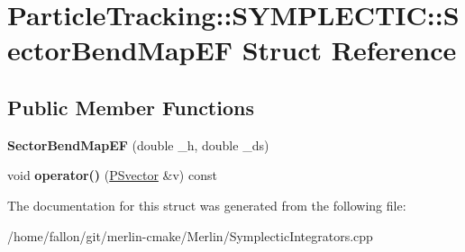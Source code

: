 \hypertarget{structParticleTracking_1_1SYMPLECTIC_1_1SectorBendMapEF}{}\section{Particle\+Tracking\+:\+:S\+Y\+M\+P\+L\+E\+C\+T\+IC\+:\+:Sector\+Bend\+Map\+EF Struct Reference}
\label{structParticleTracking_1_1SYMPLECTIC_1_1SectorBendMapEF}
\subsection*{Public Member Functions}
\begin{DoxyCompactItemize}
\item 
\mbox{\label{structParticleTracking_1_1SYMPLECTIC_1_1SectorBendMapEF_af3fdf64108479cdfd8092724014399a9}} 
{\bfseries Sector\+Bend\+Map\+EF} (double \+\_\+h, double \+\_\+ds)
\item 
\mbox{\label{structParticleTracking_1_1SYMPLECTIC_1_1SectorBendMapEF_abd7fcf774577927f6e758299a7aed262}} 
void {\bfseries operator()} (\hyperlink{classPSvector}{P\+Svector} \&v) const
\end{DoxyCompactItemize}


The documentation for this struct was generated from the following file\+:\begin{DoxyCompactItemize}
\item 
/home/fallon/git/merlin-\/cmake/\+Merlin/Symplectic\+Integrators.\+cpp\end{DoxyCompactItemize}
